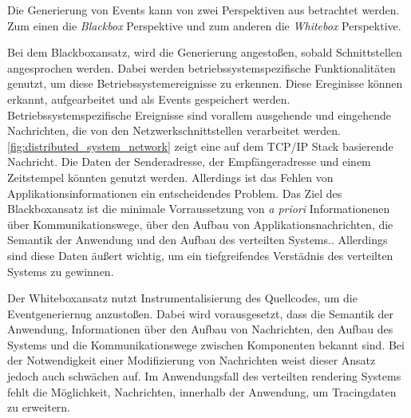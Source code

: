 Die Generierung von Events kann von zwei Perspektiven aus betrachtet werden.
Zum einen die \emph{Blackbox} Perspektive und zum anderen die \emph{Whitebox} Perspektive.

Bei dem Blackboxansatz, wird die Generierung angestoßen, sobald Schnittstellen angesprochen werden. Dabei werden betriebssystemspezifische Funktionalitäten genutzt, um diese Betriebssystemereignisse zu erkennen. Diese Ereginisse können erkannt, aufgearbeitet und als Events gespeichert werden. Betriebssystemspezifische Ereignisse sind vorallem ausgehende und eingehende Nachrichten, die von den Netzwerkschnittstellen verarbeitet werden. \cref{fig:distributed_system_network} zeigt eine auf dem TCP/IP Stack basierende Nachricht. Die Daten der Senderadresse, der Empfängeradresse und einem Zeitstempel könnten genutzt werden. Allerdings ist das Fehlen von Applikationsinformationen ein entscheidendes Problem. Das Ziel des Blackboxansatz ist die minimale Vorraussetzung von \emph{a priori} Informationenen über Kommunikationswege, über den Aufbau von Applikationsnachrichten, die Semantik der Anwendung und den Aufbau des verteilten Systems.. Allerdings sind diese Daten äußert wichtig, um ein tiefgreifendes Verstädnis des verteilten Systems zu gewinnen. 

Der Whiteboxansatz nutzt Instrumentalisierung des Quellcodes, um die Eventgeneriernug anzustoßen. Dabei wird vorausgesetzt, dass die Semantik der Anwendung, Informationen über den Aufbau von Nachrichten, den Aufbau des Systems und die Kommunikationswege zwischen Komponenten bekannt sind. Bei der Notwendigkeit einer Modifizierung von Nachrichten weist dieser Ansatz jedoch auch schwächen auf. Im Anwendungsfall des verteilten rendering Systems fehlt die Möglichkeit, Nachrichten, innerhalb der Anwendung, um Tracingdaten zu erweitern.


